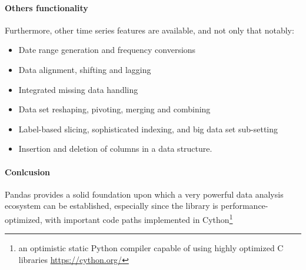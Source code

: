 \paragraph{Others functionality}
Furthermore, other time series features are available, and not only that notably:
\begin{itemize}
    \item Date range generation and frequency conversions
    \item Data alignment, shifting and lagging
    \item Integrated missing data handling
    \item Data set reshaping, pivoting, merging and combining
    \item Label-based slicing, sophisticated indexing, and big data set sub-setting
    \item Insertion and deletion of columns in a data structure.
\end{itemize}
\paragraph{Conlcusion}
Pandas provides a solid foundation upon which a very powerful data analysis ecosystem can be established, especially since the library is performance-optimized,
with important code paths implemented in Cython\footnote{an optimistic static Python compiler capable of using highly optimized C libraries \url{https://cython.org/}}
